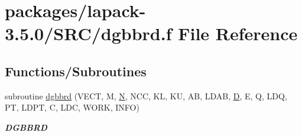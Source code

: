 \hypertarget{dgbbrd_8f}{}\section{packages/lapack-\/3.5.0/\+S\+R\+C/dgbbrd.f File Reference}
\label{dgbbrd_8f}
\subsection*{Functions/\+Subroutines}
\begin{DoxyCompactItemize}
\item 
subroutine \hyperlink{group__doubleGBcomputational_gadcc28a5e7f0df2097dc2bfbe2d287621}{dgbbrd} (V\+E\+C\+T, M, \hyperlink{polmisc_8c_a0240ac851181b84ac374872dc5434ee4}{N}, N\+C\+C, K\+L, K\+U, A\+B, L\+D\+A\+B, \hyperlink{odrpack_8h_a7dae6ea403d00f3687f24a874e67d139}{D}, E, Q, L\+D\+Q, P\+T, L\+D\+P\+T, C, L\+D\+C, W\+O\+R\+K, I\+N\+F\+O)
\begin{DoxyCompactList}\small\item\em {\bfseries D\+G\+B\+B\+R\+D} \end{DoxyCompactList}\end{DoxyCompactItemize}
